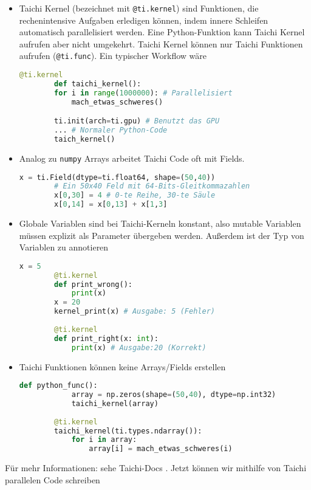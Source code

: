 \documentclass{article}
\begin{document}
\begin{itemize}
	\item Taichi Kernel (bezeichnet mit \lstinline|@ti.kernel|) sind Funktionen, die rechenintensive Aufgaben erledigen können, indem innere Schleifen automatisch parallelisiert werden. Eine Python-Funktion kann Taichi Kernel aufrufen aber nicht umgekehrt. Taichi Kernel können nur Taichi Funktionen aufrufen (\lstinline|@ti.func|). Ein typischer Workflow wäre
	\begin{lstlisting}[language=python]
		@ti.kernel
		def taichi_kernel():
		for i in range(1000000): # Parallelisiert
			mach_etwas_schweres()

		ti.init(arch=ti.gpu) # Benutzt das GPU 
		... # Normaler Python-Code
		taich_kernel() 
	\end{lstlisting}

	\item Analog zu \lstinline|numpy| Arrays arbeitet Taichi Code oft mit Fields.	
	\begin{lstlisting}[language=python]
		x = ti.Field(dtype=ti.float64, shape=(50,40))
		# Ein 50x40 Feld mit 64-Bits-Gleitkommazahlen
		x[0,30] = 4 # 0-te Reihe, 30-te Säule
		x[0,14] = x[0,13] + x[1,3]
	\end{lstlisting}
	
	\item Globale Variablen sind bei Taichi-Kerneln konstant, also mutable Variablen müssen explizit als Parameter übergeben werden. Außerdem ist der Typ von Variablen zu annotieren
		\begin{lstlisting}[language=python]
		x = 5
		@ti.kernel
		def print_wrong():
			print(x)
		x = 20
		kernel_print(x) # Ausgabe: 5 (Fehler)
		
		@ti.kernel
		def print_right(x: int):
			print(x) # Ausgabe:20 (Korrekt)
	\end{lstlisting}
	
	\item Taichi Funktionen können keine Arrays/Fields erstellen
		\begin{lstlisting}[language=python]
		def python_func():
			array = np.zeros(shape=(50,40), dtype=np.int32)
			taichi_kernel(array)
		
		@ti.kernel
		taichi_kernel(ti.types.ndarray()):
			for i in array:
				array[i] = mach_etwas_schweres(i)
	\end{lstlisting}
\end{itemize}
Für mehr Informationen: sehe Taichi-Docs \cite{taichi}. Jetzt können wir mithilfe von Taichi parallelen Code schreiben
\end{document}
